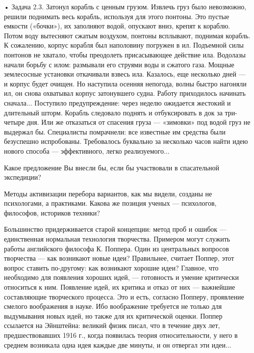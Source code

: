 •  Задача 2.3.  Затонул корабль  с  ценным грузом.  Извлечь груз  было
невозможно,  решили  поднимать  весь   корабль,  используя  для  этого
понтоны. Это  пустые емкости  («бочки»), их заполняют  водой, опускают
вниз,  крепят  к  кораблю.   Потом  воду  вытесняют  сжатым  воздухом,
понтоны всплывают,  поднимая корабль. К сожалению,  корпус корабля был
наполовину погружен  в ил. Подъемной  силы понтонов не  хватало, чтобы
преодолеть  присасывающее  действие  ила.  Водолазы  начали  борьбу  с
илом: размывали  его струями воды  и сжатого газа.  Мощные землесосные
установки  откачивали взвесь  ила. Казалось,  еще несколько  дней —  и
корпус  будет  очищен. Но  наступила  осенняя  непогода, волны  быстро
нагоняли  ил,  он снова  охватывал  корпус  затонувшего судна.  Работу
приходилось начинать сначала... Поступило предупреждение: через неделю
ожидается  жестокий  и  длительный шторм.  Корабль  следовало  поднять
и  отбуксировать  в  док  за  три-четыре дня.  Или  же  отказаться  от
спасения груза — «зимовки» под  водой груз не выдержал бы. Специалисты
помрачнели:  все известные  им средства  были безуспешно  испробованы.
Требовалось буквально за  несколько часов найти идею  нового способа —
эффективного, легко реализуемого...

Какое предложение  Вы внесли  бы, если  бы участвовали  в спасательной
экспедиции?


Методы  активизации  перебора вариантов,  как  мы  видели, созданы  не
психологами,  а практиками.  Какова  же позиция  ученых —  психологов,
философов, историков техники?

Большинство  придерживается старой  концепции: метод  проб и  ошибок —
единственная нормальная технология  творчества. Примером могут служить
работы английского  философа К. Поппера. Один  из центральных вопросов
творчества  — как  возникают новые  идеи? Правильнее,  считает Поппер,
этот вопрос  ставить по-другому: как возникают  хорошие идеи? Главное,
что  необходимо для  появления  хороших идей,  —  готовность и  умение
критически относиться к ним. Появление идей, их критика и отказ от них
— важнейшие  составляющие творческого  процесса. Это и  есть, согласно
Попперу,  проявление  смелого  воображения в  науке.  Ибо  воображение
требуется  не только  для  выдумывания  новых идей,  но  также для  их
критической  оценки.  Поппер  ссылается на  Эйнштейна:  великий  физик
писал,  что  в  течение  двух лет,  предшествовавших  1916  г.,  когда
появилась теория относительности, у него в среднем возникала одна идея
каждые две минуты, и он отвергал эти идеи...

